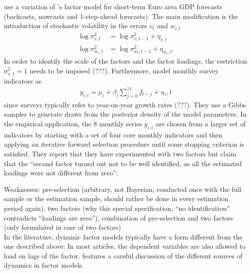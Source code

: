 \documentclass[12pt,a4paper]{scrartcl}
\begin{document}

\textbf{\citet{MarcellinoEtal2016}} use a variation of \citet{MarianoMurasawa2003}'s factor model for short-term Euro area GDP forecasts (backcasts, nowcasts and 1-step-ahead forecasts). The main modification is the introduction of stochastic volatility in the errors $v_t$ and $w_{i,t}$
\begin{align}
\log \sigma_{v,t}^2   &= \log \sigma_{v,t-1}^2 + \eta_{v, t} \\
\log \sigma_{w_i,t}^2 &= \log \sigma_{w_i,t-1}^2 + \eta_{w_i, t}.
\end{align}
In order to identify the scale of the factors and the factor loadings, the restriction $\sigma_{v,1}^2 = 1$ needs to be imposed (???). Furthermore, \citet{MarcellinoEtal2016} model monthly survey indicators as
\begin{align}
y_{i,t} = \mu_i + \beta_i \sum_{j=0}^{11} f_{t-j} + u_i,t
\end{align}
since surveys typically refer to year-on-year growth rates (???). They use a Gibbs sampler to generate draws from the posterior density of the model parameters. In the empirical application, the $8$ monthly series $y_{i,t}$ are chosen from a larger set of indicators by starting with a set of four core monthly indicators and then applying an iterative forward selection procedure until some stopping criterion is satisfied. They report that they have experimented with two factors but claim that the ``second factor turned out not to be well identified, as all the estimated loadings were not different from zero'':

Weaknesses: pre-selection (arbitrary, not Bayesian, conducted once with the full sample or the estimation sample, should rather be done in every estimation period again), two factors (why this special specification, ``no identification'' contradicts ``loadings are zero''), combination of pre-selection and two factors (only formulated in case of two factors)
\\

In the literature, dynamic factor models typically have a form different from the one described above: In most articles, the dependent variables are also allowed to load on lags of the factor. \citet{BaiWang2015} features a careful discussion of the different sources of dynamics in factor models.
\end{document}
